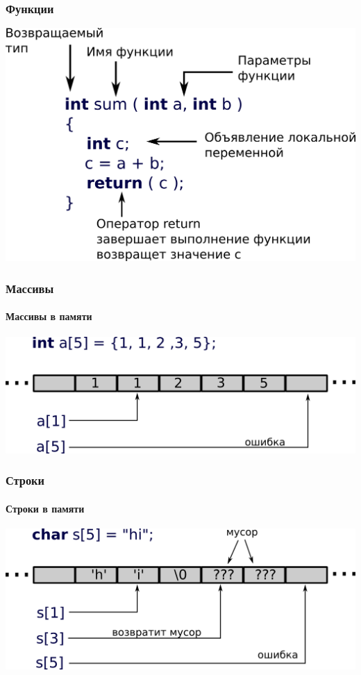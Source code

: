 \documentclass[12pt,pdf,hyperref={unicode}]{beamer}
\begin{document}
\begin{frame}[fragile]
\frametitle{Функции} 
\begin{center}
\includegraphics[width=0.8\linewidth]{images/function_syntax.png}
\end{center}
\end{frame}

\begin{frame}[fragile]
\frametitle{Массивы} 
\framesubtitle{Массивы в памяти}
\begin{center}
\includegraphics[width=0.95\linewidth]{images/array_in_memory.png}
\end{center}
\end{frame}

\begin{frame}[fragile]
\frametitle{Строки} 
\framesubtitle{Строки в памяти}
\begin{center}
\includegraphics[width=0.95\linewidth]{images/string_in_memory.png}
\end{center}
\end{frame}
\end{document}
